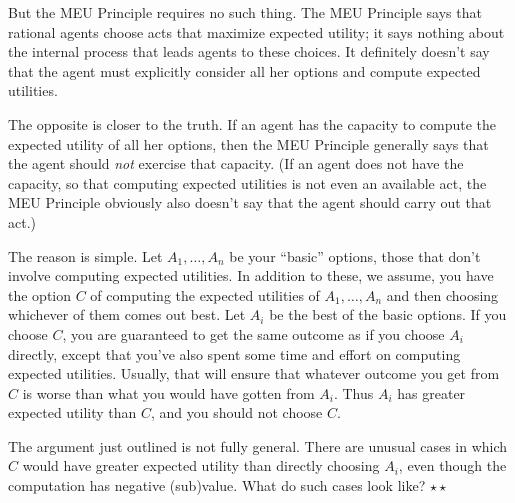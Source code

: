 But the MEU Principle requires no such thing. The MEU Principle says
that rational agents choose acts that maximize expected utility; it
says nothing about the internal process that leads agents to these
choices. It definitely doesn't say that the agent must explicitly
consider all her options and compute expected utilities.

The opposite is closer to the truth. If an agent has the capacity to
compute the expected utility of all her options, then the MEU
Principle generally says that the agent should \emph{not} exercise
that capacity. (If an agent does not have the capacity, so that
computing expected utilities is not even an available act, the MEU
Principle obviously also doesn't say that the agent should carry out that act.)

The reason is simple. Let $A_1,\ldots,A_n$ be your ``basic'' options,
those that don't involve computing expected utilities. In addition to
these, we assume, you have the option $C$ of computing the expected
utilities of $A_1,\ldots,A_n$ and then choosing whichever of them
comes out best. Let $A_i$ be the best of the basic options. If you
choose $C$, you are guaranteed to get the same outcome as if you
choose $A_i$ directly, except that you've also spent some time and effort
on computing expected utilities. Usually, that will ensure that
whatever outcome you get from $C$ is worse than what you would have
gotten from $A_i$. Thus $A_i$ has greater expected utility than $C$,
and you should not choose $C$.

\begin{exercise}
  The argument just outlined is not fully general. There are unusual
  cases in which $C$ would have greater expected utility than directly
  choosing $A_i$, even though the computation has negative
  (sub)value. What do such cases look like? $\star\star$
\end{exercise}


